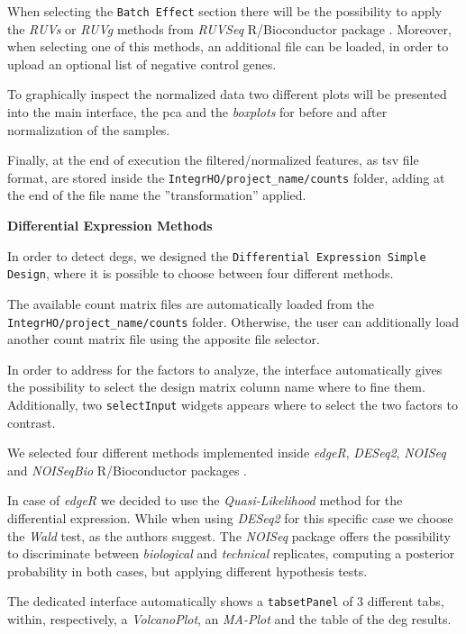 When selecting the \lstinline!Batch Effect! section there will be the possibility to apply the \textit{RUVs} or \textit{RUVg} methods from \textit{RUVSeq} R/Bioconductor package \cite{Risso2014h}.
Moreover, when selecting one of this methods, an additional file can be loaded, in order to upload an optional list of negative control genes.

To graphically inspect the normalized data two different plots will be presented into the main interface, the \gls{pca} and the \textit{boxplots} for before and after normalization of the samples.

Finally, at the end of execution the filtered/normalized features, as \gls{tsv} file format, are stored inside the \lstinline!IntegrHO/project_name/counts! folder, adding at the end of the file name the ''transformation'' applied.


{\setlength{\parindent}{0cm}\textbf{Differential Expression Methods}}

In order to detect \glspl{deg}, we designed the \lstinline!Differential Expression Simple Design!, where it is possible to choose between four different methods.

The available count matrix files are automatically loaded from the \lstinline!IntegrHO/project_name/counts! folder.
Otherwise, the user can additionally load another count matrix file using the apposite file selector.

In order to address for the factors to analyze, the interface automatically gives the possibility to select the design matrix column name where to fine them.
Additionally, two \lstinline!selectInput! widgets appears where to select the two factors to contrast.

We selected four different methods implemented inside \textit{edgeR}, \textit{DESeq2}, \textit{NOISeq} and \textit{NOISeqBio} R/Bioconductor packages \cite{Robinson2009, Love2014,Tarazona2012}.

In case of \textit{edgeR} we decided to use the \textit{Quasi-Likelihood} method for the differential expression.
While when using \textit{DESeq2} for this specific case we choose the \textit{Wald} test, as the authors suggest.
The \textit{NOISeq} package offers the possibility to discriminate between \textit{biological} and \textit{technical} replicates, computing a posterior probability in both cases, but applying different hypothesis tests.

The dedicated interface automatically shows a \lstinline!tabsetPanel! of 3 different tabs, within, respectively, a \textit{VolcanoPlot}, an \textit{MA-Plot} and the table of the \gls{deg} results.


